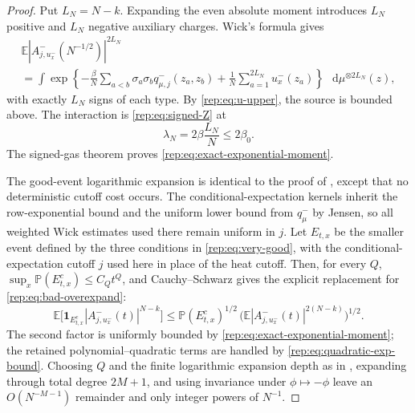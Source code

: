 \documentclass[11pt,reqno]{amsart}
\numberwithin{equation}{section}
\theoremstyle{plain}
\theoremstyle{definition}
\newcommand{\dd}{\mathop{}\!\mathrm d}
\newcommand{\E}{\mathbb E}
\newcommand{\be}{\beta}
\begin{document}
\begin{proof}
Put $L_N=N-k$.  Expanding the even absolute moment introduces $L_N$ positive and $L_N$ negative auxiliary charges.  Wick's formula gives
\begin{multline}\label{rep:eq:even-moment-signed}
 \E|A^-_{j,u_x^-}(N^{-1/2})|^{2L_N}\\
 =\int\exp\left\{-\frac\be N
 \sum_{a<b}\sigma_a\sigma_bq^-_{\mu,j}(z_a,z_b)
 +\frac1N\sum_{a=1}^{2L_N}u_x^-(z_a)\right\}
 \,\dd\mu^{\otimes2L_N}(z),
\end{multline}
with exactly $L_N$ signs of each type.  By \eqref{rep:eq:u-upper}, the source is bounded above.  The interaction is \eqref{rep:eq:signed-Z} at
\begin{equation}\label{rep:eq:effective-lambda}
 \lambda_N=2\be\frac{L_N}{N}\le2\be_0.
\end{equation}
The signed-gas theorem proves \eqref{rep:eq:exact-exponential-moment}.

The good-event logarithmic expansion is identical to the proof of , except that no deterministic cutoff cost occurs.  The conditional-expectation kernels inherit the row-exponential bound and the uniform lower bound from $q^-_\mu$ by Jensen, so all weighted Wick estimates used there remain uniform in $j$.  Let $E_{t,x}$ be the smaller event defined by the three conditions in \eqref{rep:eq:very-good}, with the conditional-expectation cutoff $j$ used here in place of the heat cutoff. Then, for every $Q$,
$\sup_x\mathbb P(E_{t,x}^c)\le C_Qt^Q$, and Cauchy--Schwarz gives the explicit replacement for \eqref{rep:eq:bad-overexpand}:
\begin{equation}
 \E\big[\mathbf1_{E_{t,x}^c}|A^-_{j,u_x^-}(t)|^{N-k}\big]
 \le \mathbb P(E_{t,x}^c)^{1/2}\,
 \Big(\E|A^-_{j,u_x^-}(t)|^{2(N-k)}\Big)^{1/2}.
\end{equation}
The second factor is uniformly bounded by \eqref{rep:eq:exact-exponential-moment}; the retained polynomial--quadratic terms are handled by \eqref{rep:eq:quadratic-exp-bound}.  Choosing $Q$ and the finite logarithmic expansion depth as in , expanding through total degree $2M+1$, and using invariance under $\phi\mapsto-\phi$ leave an $O(N^{-M-1})$ remainder and only integer powers of $N^{-1}$.


\end{proof}
\end{document}
